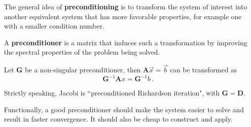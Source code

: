\documentclass[12pt]{article}
\newcommand{\ve}[1]{\ensuremath{\mathbf{#1}}}
\begin{document}
The general idea of \textbf{preconditioning} is to transform the system of interest into another equivalent system that has more favorable properties, for example one with a smaller condition number. 

A \textbf{preconditioner} is a matrix that induces such a transformation by improving the spectral properties of the problem being solved. 

Let $\ve{G}$ be a non-singular preconditioner, then \cite{Benzi2002} $\ve{A}\vec{x}=\vec{b}$ can be transformed as 
\[ \ve{G}^{-1}\ve{A}x = \ve{G}^{-1}b \:.\] 

Strictly speaking, Jacobi is ``preconditioned Richardson iteration", with $\ve{G} = \ve{D}$.
%


Functionally, a good preconditioner should make the system easier to solve and result in faster convergence. It should also be cheap to construct and apply. %
\end{document}
